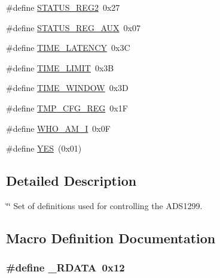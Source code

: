 \begin{DoxyCompactItemize}
$$\#define \hyperlink{group__Definitions__ADS1299_gac5289782d4398220ff718751de7e8f15}{S\+T\+A\+T\+U\+S\+\_\+\+R\+E\+G2}~0x27
\item 
\#define \hyperlink{group__Definitions__ADS1299_ga6c61d1e86c806ad8ec147553bc2ae65e}{S\+T\+A\+T\+U\+S\+\_\+\+R\+E\+G\+\_\+\+A\+UX}~0x07
\item 
\#define \hyperlink{group__Definitions__ADS1299_gac30c996ced5888ea4564189fd45a1ce1}{T\+I\+M\+E\+\_\+\+L\+A\+T\+E\+N\+CY}~0x3C
\item 
\#define \hyperlink{group__Definitions__ADS1299_gacb7e51d1df3047c08c50ae6682a6cd70}{T\+I\+M\+E\+\_\+\+L\+I\+M\+IT}~0x3B
\item 
\#define \hyperlink{group__Definitions__ADS1299_gabef5be0b55aff45fba055caae72d00ab}{T\+I\+M\+E\+\_\+\+W\+I\+N\+D\+OW}~0x3D
\item 
\#define \hyperlink{group__Definitions__ADS1299_ga4a86daacd56e474a56e206416ae4b7fb}{T\+M\+P\+\_\+\+C\+F\+G\+\_\+\+R\+EG}~0x1F
\item 
\#define \hyperlink{group__Definitions__ADS1299_ga9fcb9e460d175bfc7ab4d80bf788b43a}{W\+H\+O\+\_\+\+A\+M\+\_\+I}~0x0F
\item 
\#define \hyperlink{group__Definitions__ADS1299_ga7ebc9a785e5ab85457c98595aac81589}{Y\+ES}~(0x01)
\end{DoxyCompactItemize}


\subsection{Detailed Description}
\char`\"{}\char`\"{} Set of definitions used for controlling the A\+D\+S1299. 

\subsection{Macro Definition Documentation}
\subsubsection[{\texorpdfstring{\+\_\+\+R\+D\+A\+TA}{_RDATA}}]{\setlength{\rightskip}{0pt plus 5cm}\#define \+\_\+\+R\+D\+A\+TA~0x12}\hypertarget{group__Definitions__ADS1299_ga0902995cb5c5c4c46e34653033f74e08}{}\label{group__Definitions__ADS1299_ga0902995cb5c5c4c46e34653033f74e08}


